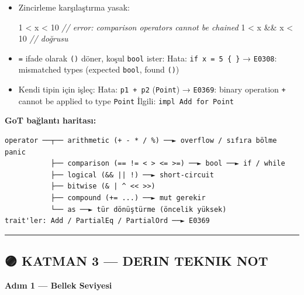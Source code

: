 \documentclass[12pt,a4paper]{article}
\newenvironment{Shaded}{}{}
\newcommand{\CommentTok}[1]{\textcolor[rgb]{0.38,0.63,0.69}{\textit{#1}}}
\newcommand{\DecValTok}[1]{\textcolor[rgb]{0.25,0.63,0.44}{#1}}
\newcommand{\NormalTok}[1]{#1}
\newcommand{\OperatorTok}[1]{\textcolor[rgb]{0.40,0.40,0.40}{#1}}
\begin{document}
\begin{itemize}
  Hata: \texttt{a\ as\ u64\ \textless{}\ b} → \texttt{error:\ \textless{}\ is\ interpreted\ as\ a\ start\ of\ generic\ arguments\ for\ u64,\ not\ a\ comparison}
\item
  Zincirleme karşılaştırma yasak:

\begin{Shaded}
\begin{Highlighting}[]
\DecValTok{1} \OperatorTok{\textless{}}\NormalTok{ x }\OperatorTok{\textless{}} \DecValTok{10}             \CommentTok{// error: comparison operators cannot be chained}
\DecValTok{1} \OperatorTok{\textless{}}\NormalTok{ x }\OperatorTok{\&\&}\NormalTok{ x }\OperatorTok{\textless{}} \DecValTok{10}        \CommentTok{// doğrusu}
\end{Highlighting}
\end{Shaded}
\item
  \texttt{=} ifade olarak \texttt{()} döner, koşul \texttt{bool} ister:
  Hata: \texttt{if\ x\ =\ 5\ \{\ \}} → \texttt{E0308}: mismatched types (expected \texttt{bool}, found \texttt{()})
\item
  Kendi tipin için işleç:
  Hata: \texttt{p1\ +\ p2} (\texttt{Point}) → \texttt{E0369}: binary operation \texttt{+} cannot be applied to type \texttt{Point}
  İlgili: \texttt{impl\ Add\ for\ Point}
\end{itemize}

\textbf{GoT bağlantı haritası:}

\begin{verbatim}
operator ──┬── arithmetic (+ - * / %) ──► overflow / sıfıra bölme panic
           ├── comparison (== != < > <= >=) ──► bool ──► if / while
           ├── logical (&& || !) ──► short-circuit
           ├── bitwise (& | ^ << >>)
           ├── compound (+= ...) ──► mut gerekir
           └── as ──► tür dönüştürme (öncelik yüksek)
trait'ler: Add / PartialEq / PartialOrd ──► E0369
\end{verbatim}

\begin{center}\rule{0.5\linewidth}{0.5pt}\end{center}

\subsection{🟣 KATMAN 3 --- DERIN TEKNIK NOT}\label{katman-3-—-derin-teknik-not-4}

\textbf{Adım 1 --- Bellek Seviyesi}
\end{document}

